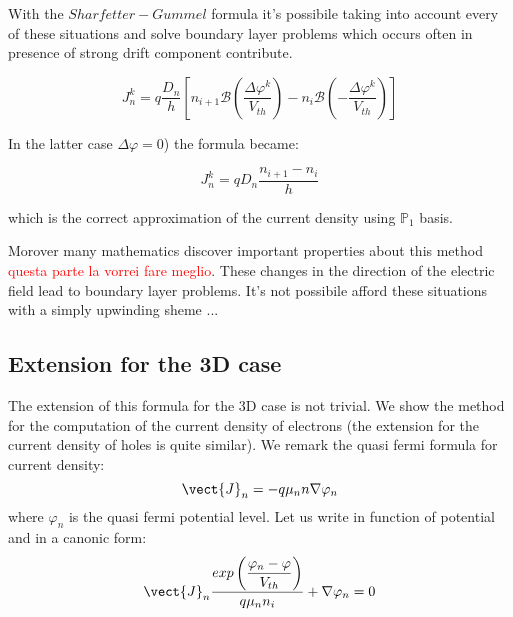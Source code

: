 \begin{center}


\end{center}


With the $Sharfetter-Gummel$ formula it's possibile taking into account every of these situations and solve boundary layer problems which occurs often in presence of strong drift component contribute.

 \begin{equation}
\label{eq: scharfetter gummel 1D electron}
J_n^k=q\frac{D_n}{h}
\left[ n_{i+1}\mathcal{B}\left(\frac{\Delta \varphi^k}{V_{th}}\right)- n_i\mathcal{B}\left(-\frac{\Delta \varphi^k}{V_{th}}\right)\right]  
\end{equation}

In the latter case $\Delta \varphi=0$) the formula became:

\begin{equation}
J_n^k=qD_n\frac{n_{i+1}-n_{i}}{h}
\end{equation}

which is the correct approximation of the current density using $\mathbb{P}_1$ basis. 

Morover many mathematics discover important properties about this method \textcolor{red}{questa parte la vorrei fare meglio}. 
These changes in the direction of the electric field lead to boundary layer problems. It's not possibile afford these situations with a simply upwinding sheme ...

\subsection{Extension for the 3D case}
 
The extension of this formula for the 3D case is not trivial. We show the method for the computation of the current density of electrons (the extension for the current density of holes is quite similar).
We remark the quasi fermi formula for current density:
\begin{equation}
\label{eq: current density fermi}
\vect{J}_n=-q \mu_n n \nabla \varphi_n
\end{equation}
where $\varphi_n$ is the quasi fermi potential level. Let us write  in function of potential and in a canonic form:
\begin{equation}
\label{eq: current density canonic form}
\vect{J}_n\dfrac{ exp\left(\dfrac{\varphi_n-\varphi}{V_{th}}\right)}{q \mu_n n_i} + \nabla \varphi_n = 0
\end{equation}

